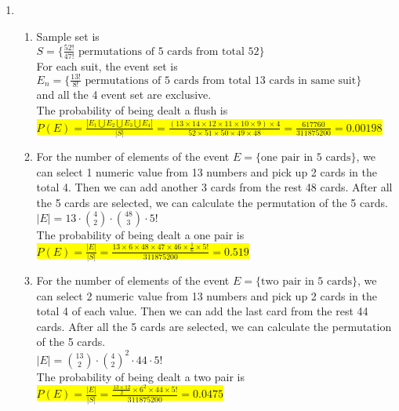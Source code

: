\documentclass{article}
\begin{document}
\begin{enumerate}
	\item
	\begin{enumerate}
		\item
		\mysolu
		Sample set is\\
		${S=\{{\frac{52!}{47!}}\text{ permutations of 5 cards from total 52}\}}$\\
		
		For each suit, the event set is\\
		${E_n=\{{\frac{13!}{8!}}\text{ permutations of 5 cards from total 13 cards in same suit}\}}$\\
		and all the 4 event set are exclusive.\\
		\myansw
		The probability of being dealt a flush is\\
		\colorbox{yellow}{
			${
				P(E)=\frac{|E_1\bigcup E_2\bigcup E_3\bigcup E_4|}{|S|} = \frac{(13\times14\times12\times11\times10\times9)\times4}{52\times51\times50\times49\times48}=\frac{617760}{311875200}=0.00198
			}$
		}\\
		
		\item
		\mysolu
		For the number of elements of the event ${E=\{\text{one pair in 5 cards}\}}$, we can select 1 numeric value from 13 numbers and pick up 2 cards in the total 4. Then we can add another 3 cards from the rest 48 cards. After all the 5 cards are selected, we can calculate the permutation of the 5 cards.\\
		${|E|=13\cdot{4 \choose 2}\cdot{48 \choose 3} \cdot 5!}$\\
		\myansw
		The probability of being dealt a one pair is\\
		\colorbox{yellow}{
			${P(E)=\frac{|E|}{|S|}=\frac{13\times6\times48\times47\times46\times \frac{1}{6} \times 5!}{311875200}=0.519}$
		}
	
		\item
		\mysolu
		For the number of elements of the event ${E=\{\text{two pair in 5 cards}\}}$, we can select 2 numeric value from 13 numbers and pick up 2 cards in the total 4 of each value. Then we can add the last card from the rest 44 cards. After all the 5 cards are selected, we can calculate the permutation of the 5 cards.\\
		${|E|={13 \choose 2}\cdot{4 \choose 2}^2 \cdot44\cdot 5!}$\\
		\myansw
		The probability of being dealt a two pair is\\
		\colorbox{yellow}{
			${P(E)=\frac{|E|}{|S|}=\frac{\frac{13\times12}{2}\times6^2\times44\times 5!}{311875200}=0.0475}$
		}
	

\end{enumerate}
\end{enumerate}
\end{document}
